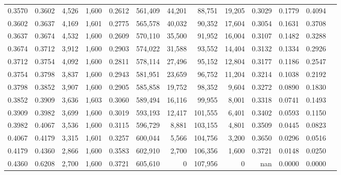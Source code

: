 \begin{tabular}{rrrrrrrrrrrrr}
0.3570 & 0.3602 &  4,526 & 1,600 &                                     0.2612 & 561,409 &  44,201 &  88,751 &  19,205 & 0.3029 & 0.1779 & 0.4094 \\
0.3602 & 0.3637 &  4,169 & 1,601 &                                     0.2775 & 565,578 &  40,032 &  90,352 &  17,604 & 0.3054 & 0.1631 & 0.3708 \\
0.3637 & 0.3674 &  4,532 & 1,600 &                                     0.2609 & 570,110 &  35,500 &  91,952 &  16,004 & 0.3107 & 0.1482 & 0.3288 \\
0.3674 & 0.3712 &  3,912 & 1,600 &                                     0.2903 & 574,022 &  31,588 &  93,552 &  14,404 & 0.3132 & 0.1334 & 0.2926 \\
0.3712 & 0.3754 &  4,092 & 1,600 &                                     0.2811 & 578,114 &  27,496 &  95,152 &  12,804 & 0.3177 & 0.1186 & 0.2547 \\
0.3754 & 0.3798 &  3,837 & 1,600 &                                     0.2943 & 581,951 &  23,659 &  96,752 &  11,204 & 0.3214 & 0.1038 & 0.2192 \\
0.3798 & 0.3852 &  3,907 & 1,600 &                                     0.2905 & 585,858 &  19,752 &  98,352 &   9,604 & 0.3272 & 0.0890 & 0.1830 \\
0.3852 & 0.3909 &  3,636 & 1,603 &                                     0.3060 & 589,494 &  16,116 &  99,955 &   8,001 & 0.3318 & 0.0741 & 0.1493 \\
0.3909 & 0.3982 &  3,699 & 1,600 &                                     0.3019 & 593,193 &  12,417 & 101,555 &   6,401 & 0.3402 & 0.0593 & 0.1150 \\
0.3982 & 0.4067 &  3,536 & 1,600 &                                     0.3115 & 596,729 &   8,881 & 103,155 &   4,801 & 0.3509 & 0.0445 & 0.0823 \\
0.4067 & 0.4179 &  3,315 & 1,601 &                                     0.3257 & 600,044 &   5,566 & 104,756 &   3,200 & 0.3650 & 0.0296 & 0.0516 \\
0.4179 & 0.4360 &  2,866 & 1,600 &                                     0.3583 & 602,910 &   2,700 & 106,356 &   1,600 & 0.3721 & 0.0148 & 0.0250 \\
0.4360 & 0.6208 &  2,700 & 1,600 &                                     0.3721 & 605,610 &       0 & 107,956 &       0 &    nan & 0.0000 & 0.0000 \\
\bottomrule
\end{tabular}
